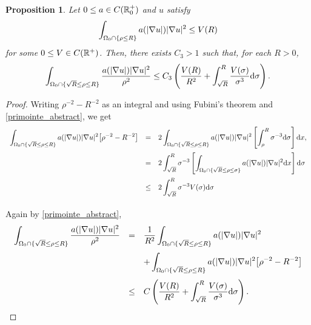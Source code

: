 \documentclass[10 pt,a4paper]{article}
\newtheorem{proposition}[definition]{Proposition}
\theoremstyle{definition}
\begin{document}
\begin{proposition}\label{prop_inteannuli}
	Let $0 \le a \in C(\mathbb R^+_0)$ and $u$ satisfy
	\begin{equation}\label{primointe_abstract}
		\int_{\Omega_0 \cap \{\rho \le R\}} a(|\nabla u|) |\nabla u|^2 \le V(R)
	\end{equation}
	for some $0 \le V\in C(\mathbb R^+)$. Then, there exists $C_3>1$ such that, for each $R>0$, 
	\[
		\int_{\Omega_0 \cap \{\sqrt{R} \le \rho \le R\}} \frac{a(|\nabla u|) |\nabla u|^2}{\rho^2} \le C_3\left( \frac{V(R)}{R^2} + \int_{\sqrt{R}}^R \frac{V(\sigma)}{\sigma^3} \mathrm{d} \sigma\right).
	\]
\end{proposition}
%
\begin{proof}
	Writing $\rho^{-2}-R^{-2}$ as an integral and using Fubini's theorem and \eqref{primointe_abstract}, we get
	\[
	\begin{array}{lcl}
		\displaystyle \int_{\Omega_0 \cap \{\sqrt{R} \le \rho \le R\}} a(|\nabla u|) |\nabla u|^2 \big[\rho^{-2}-R^{-2}\big] & = & \displaystyle 2\int_{\Omega_0 \cap \{\sqrt{R} \le \rho \le R\}} a(|\nabla u|) |\nabla u|^2 \left[\int^{R}_{\rho} \sigma^{-3}\mathrm{d} \sigma\right]\mathrm{d} x, \\[0.5cm]
		& = & \displaystyle \displaystyle 2\int_{\sqrt{R}}^R \sigma^{-3} \left[\int_{\Omega_0 \cap \{\sqrt{R} \le \rho \le \sigma\}} a(|\nabla u|) |\nabla u|^2 \mathrm{d} x \right] \mathrm{d} \sigma \\[0.5cm]
		& \le & \displaystyle \displaystyle 2\int_{\sqrt{R}}^R \sigma^{-3} V(\sigma) \mathrm{d} \sigma \\[0.5cm]
	\end{array}
	\]
	Again by \eqref{primointe_abstract},
	\[
	\begin{array}{lcl}
		\displaystyle \int_{\Omega_0 \cap \{\sqrt{R} \le \rho \le R\}} \frac{a(|\nabla u|) |\nabla u|^2}{\rho^2} & = & \displaystyle \frac{1}{R^2}\int_{\Omega_0 \cap \{\sqrt{R} \le \rho \le R\}} a(|\nabla u|) |\nabla u|^2 \\[0.5cm]
		& & \displaystyle + \int_{\Omega_0 \cap \{\sqrt{R} \le \rho \le R\}} a(|\nabla u|) |\nabla u|^2 \big[\rho^{-2}-R^{-2}\big] \\[0.5cm] 
		& \le & \displaystyle C\left( \frac{V(R)}{R^2} + \int_{\sqrt{R}}^R \frac{V(\sigma)}{\sigma^3} \mathrm{d} \sigma\right).
	\end{array}
	\]
\end{proof}
\end{document}
